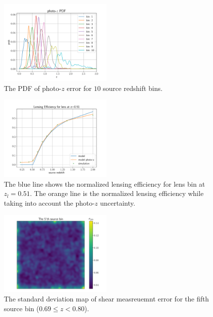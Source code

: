 \documentclass[twocolumn]{aastex62}
\begin{document}
\begin{figure}
 \centering
 \includegraphics[width=0.5\textwidth]{mlz-poz.pdf}
 \caption{The PDF of photo-$z$ error for $10$ source redshift bins.}
\end{figure}

\begin{figure}
 \centering
 \includegraphics[width=0.5\textwidth]{lensing_efficiency.pdf}
 \caption{The blue line shows the normalized lensing efficiency for lens bin at $z_{l}=0.51$. The orange line is the normalized lensing efficiency while taking into account the photo-$z$ uncertainty.}
\end{figure}


\begin{figure}
 \centering
 \includegraphics[width=0.5\textwidth]{noise_std_map_pix.pdf}
 \caption{The standard deviation map of shear measreuemnt error for the fifth source bin ($0.69 \leq z < 0.80 $).}
\end{figure}
\end{document}
